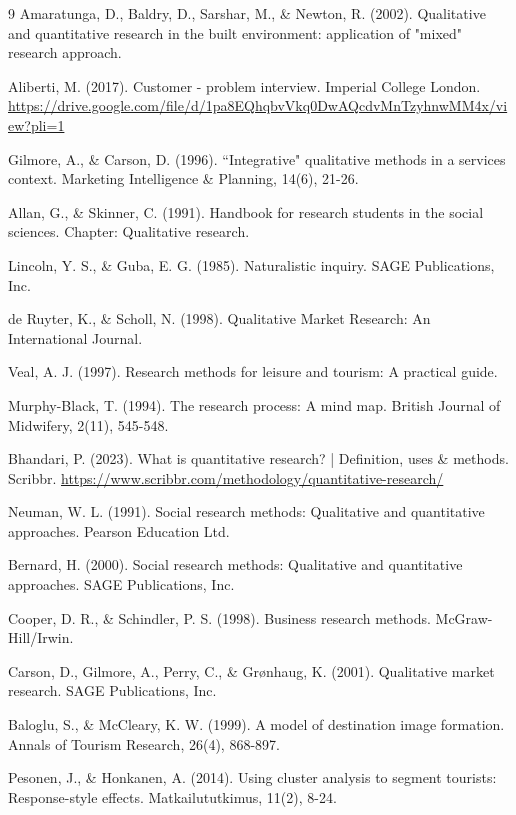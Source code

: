 \documentclass[a4paper, 12pt, twoside]{report}  %
\begin{document}
\begin{thebibliography}{9}
Amaratunga, D., Baldry, D., Sarshar, M., \& Newton, R. (2002). Qualitative and quantitative research in the built environment: application of "mixed" research approach.

Aliberti, M. (2017). Customer - problem interview. Imperial College London. \url{https://drive.google.com/file/d/1pa8EQhqbvVkq0DwAQcdvMnTzyhnwMM4x/view?pli=1}

Gilmore, A., \& Carson, D. (1996). ``Integrative" qualitative methods in a services context. Marketing Intelligence \& Planning, 14(6), 21-26.

Allan, G., \& Skinner, C. (1991). Handbook for research students in the social sciences. Chapter: Qualitative research.

Lincoln, Y. S., \& Guba, E. G. (1985). Naturalistic inquiry. SAGE Publications, Inc.

de Ruyter, K., \& Scholl, N. (1998). Qualitative Market Research: An International Journal.

Veal, A. J. (1997). Research methods for leisure and tourism: A practical guide.

Murphy-Black, T. (1994). The research process: A mind map. British Journal of Midwifery, 2(11), 545-548.

Bhandari, P. (2023). What is quantitative research? | Definition, uses \& methods. Scribbr. \url{https://www.scribbr.com/methodology/quantitative-research/}

Neuman, W. L. (1991). Social research methods: Qualitative and quantitative approaches. Pearson Education Ltd.

Bernard, H. (2000). Social research methods: Qualitative and quantitative approaches. SAGE Publications, Inc.

Cooper, D. R., \& Schindler, P. S. (1998). Business research methods. McGraw-Hill/Irwin.

Carson, D., Gilmore, A., Perry, C., \& Grønhaug, K. (2001). Qualitative market research. SAGE Publications, Inc.

Baloglu, S., \& McCleary, K. W. (1999). A model of destination image formation. Annals of Tourism Research, 26(4), 868-897.

Pesonen, J., \& Honkanen, A. (2014). Using cluster analysis to segment tourists: Response-style effects. Matkailututkimus, 11(2), 8-24.


\end{thebibliography}
\end{document}
